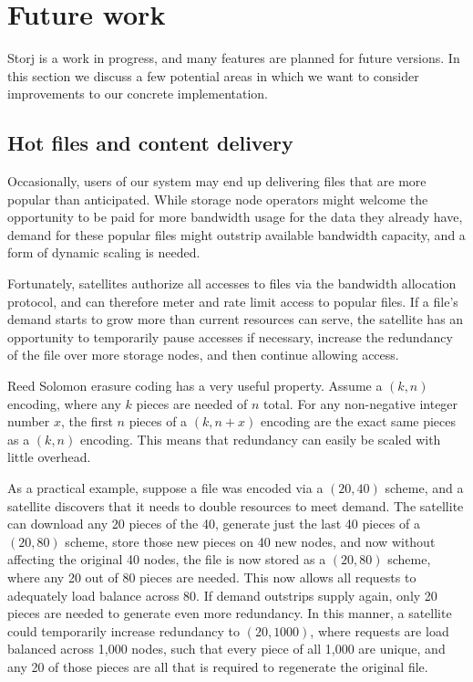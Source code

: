 \documentclass[11pt,fleqn,openany]{book}
\begin{document}
\chapter{Future work}\label{chap:future-work}

Storj is a work in progress, and many features are planned for future
versions. In this section we discuss a few potential areas in which we want to
consider improvements to our concrete implementation.

\section{Hot files and content delivery}\label{sec:future-hot-files}

Occasionally, users of our system may end up delivering files that are more
popular than anticipated. While storage node operators might welcome the
opportunity to be paid for more bandwidth usage for the data they already have,
demand for these popular files might outstrip available bandwidth capacity,
and a form of dynamic scaling is needed.

Fortunately, satellites authorize all accesses to files via the bandwidth
allocation protocol, and can therefore meter and rate limit access to popular
files. If a file's demand starts to grow more than current resources can serve,
the satellite has an opportunity to temporarily pause accesses if necessary,
increase the redundancy of the file over more storage nodes, and then continue
allowing access.

Reed Solomon erasure coding has a very useful property. Assume a $(k, n)$
encoding, where any $k$ pieces are needed of $n$ total. For any non-negative
integer number $x$, the first $n$ pieces of a $(k, n+x)$ encoding are the exact
same pieces as a $(k, n)$ encoding. This means that redundancy can easily be
scaled with little overhead.

As a practical example, suppose a file was encoded via a $(20, 40)$ scheme,
and a satellite discovers that it needs to double resources to meet demand.
The satellite can download any 20 pieces of the 40, generate just the last 40
pieces of a $(20, 80)$ scheme, store those new pieces on 40 new nodes, and now
without affecting the original 40 nodes, the file is now stored as a $(20, 80)$
scheme, where any 20 out of 80 pieces are needed. This now allows all requests
to adequately load balance across 80.
If demand outstrips supply again, only 20 pieces are needed to generate even
more redundancy. In this manner, a satellite could temporarily increase
redundancy to $(20, 1000)$, where requests are load balanced across 1,000 nodes,
such that every piece of all 1,000 are unique, and any 20 of those pieces are
all that is required to regenerate the original file.
\end{document}

